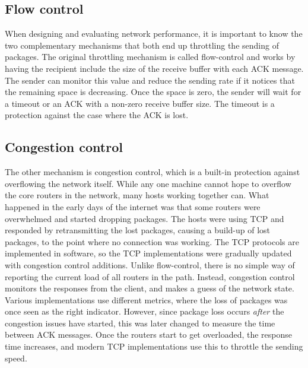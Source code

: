 \subsection{Flow control}
When designing and evaluating network performance, it is important to know the two complementary mechanisms that both end up throttling the sending of packages. The original throttling mechanism is called flow-control and works by having the recipient include the size of the receive buffer with each ACK message. The sender can monitor this value and reduce the sending rate if it notices that the remaining space is decreasing. Once the space is zero, the sender will wait for a timeout or an ACK with a non-zero receive buffer size. The timeout is a protection against the case where the ACK is lost.

\subsection{Congestion control}
The other mechanism is congestion control, which is a built-in protection against overflowing the network itself. While any one machine cannot hope to overflow the core routers in the network, many hosts working together can. What happened in the early days of the internet was that some routers were overwhelmed and started dropping packages. The hosts were using TCP and responded by retransmitting the lost packages, causing a build-up of lost packages, to the point where no connection was working. The TCP protocols are implemented in software, so the TCP implementations were gradually updated with congestion control additions. Unlike flow-control, there is no simple way of reporting the current load of all routers in the path. Instead, congestion control monitors the responses from the client, and makes a guess of the network state. Various implementations use different metrics, where the loss of packages was once seen as the right indicator. However, since package loss occurs \emph{after} the congestion issues have started, this was later changed to measure the time between ACK messages. Once the routers start to get overloaded, the response time increases, and modern TCP implementations use this to throttle the sending speed.

